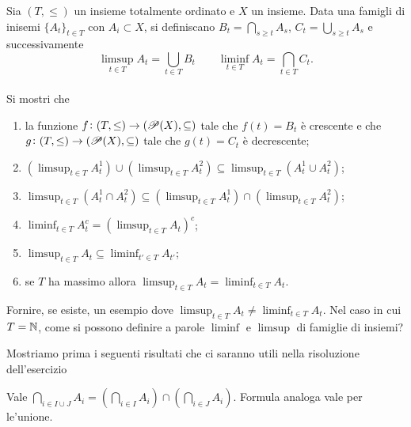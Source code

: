 \documentclass[a4paper]{article}\par \usepackage{style}\par
\begin{document}
\begin{es}
  Sia $ (T, \leq) $ un insieme totalmente ordinato e $ X $ un insieme. Data una famigli di inisemi $ \{A_t\}_{t \in T} $ con $ A_i \subset X $, si definiscano $ B_t = \bigcap_{s \geq t} A_s $, $ C_t = \bigcup_{s \geq t} A_s $ e successivamente \[\limsup_{t \in T} A_t = \bigcup_{t \in T} B_t \qquad \liminf_{t \in T} A_t = \bigcap_{t \in T} C_t.\]\\
  Si mostri che
  \begin{enumerate}
  \item la funzione $ f \colon (T, \leq) \to (\P(X), \subseteq) $ tale che $ f(t) = B_t $ è crescente e che $ g \colon (T, \leq) \to (\P(X), \subseteq) $ tale che $ g(t) = C_t $ è decrescente;
  \item $ (\limsup_{t \in T} A_t^1) \cup (\limsup_{t \in T}A_t^2) \subseteq \limsup_{t \in T} (A_t^1 \cup A_t^2) $;
  \item $ \limsup_{t \in T} (A_t^1 \cap A_t^2) \subseteq (\limsup_{t \in T} A_t^1) \cap (\limsup_{t \in T}A_t^2) $;
  \item $ \liminf_{t \in T} A_t^c = (\limsup_{t \in T} A_t)^c $;
  \item $ \limsup_{t \in T} A_t \subseteq \liminf_{t' \in T} A_{t'} $;
  \item se $ T $ ha massimo allora $ \limsup_{t \in T} A_t = \liminf_{t \in T} A_t $.
  \end{enumerate}
  Fornire, se esiste, un esempio dove $ \limsup_{t \in T} A_t \neq \liminf_{t \in T} A_t $. Nel caso in cui $ T = \N $, come si possono definire a parole $ \liminf $ e $ \limsup $ di famiglie di insiemi?
\end{es}\par 
Mostriamo prima i seguenti risultati che ci saranno utili nella risoluzione dell'esercizio\par \begin{lemma}
  Vale $ \bigcap_{i \in I \cup J} A_i = \left (\bigcap_{i \in I} A_i \right ) \cap \left (\bigcap_{i \in J} A_i \right ) $. Formula analoga vale per le'unione.
\end{lemma}
\end{document}
